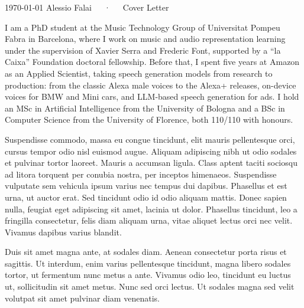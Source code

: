 \documentclass[11pt, a4paper]{templates/awesome-cv}
\begin{document}
\makecvheader[C]

\makecvfooter
  {\today}
  {Alessio Falai~~~·~~~Cover Letter}
  {\thepage}

\makelettertitle

\begin{cvletter}

I am a PhD student at the Music Technology Group of Universitat Pompeu Fabra in Barcelona, where I work on music and audio representation learning under the supervision of Xavier Serra and Frederic Font, supported by a “la Caixa” Foundation doctoral fellowship. Before that, I spent five years at Amazon as an Applied Scientist, taking speech generation models from research to production: from the classic Alexa male voices to the Alexa+ releases, on-device voices for BMW and Mini cars, and LLM-based speech generation for ads. I hold an MSc in Artificial Intelligence from the University of Bologna and a BSc in Computer Science from the University of Florence, both 110/110 with honours.

Suspendisse commodo, massa eu congue tincidunt, elit mauris pellentesque orci, cursus tempor odio nisl euismod augue. Aliquam adipiscing nibh ut odio sodales et pulvinar tortor laoreet. Mauris a accumsan ligula. Class aptent taciti sociosqu ad litora torquent per conubia nostra, per inceptos himenaeos. Suspendisse vulputate sem vehicula ipsum varius nec tempus dui dapibus. Phasellus et est urna, ut auctor erat. Sed tincidunt odio id odio aliquam mattis. Donec sapien nulla, feugiat eget adipiscing sit amet, lacinia ut dolor. Phasellus tincidunt, leo a fringilla consectetur, felis diam aliquam urna, vitae aliquet lectus orci nec velit. Vivamus dapibus varius blandit.

Duis sit amet magna ante, at sodales diam. Aenean consectetur porta risus et sagittis. Ut interdum, enim varius pellentesque tincidunt, magna libero sodales tortor, ut fermentum nunc metus a ante. Vivamus odio leo, tincidunt eu luctus ut, sollicitudin sit amet metus. Nunc sed orci lectus. Ut sodales magna sed velit volutpat sit amet pulvinar diam venenatis.

\end{cvletter}

\makeletterclosing
\end{document}
